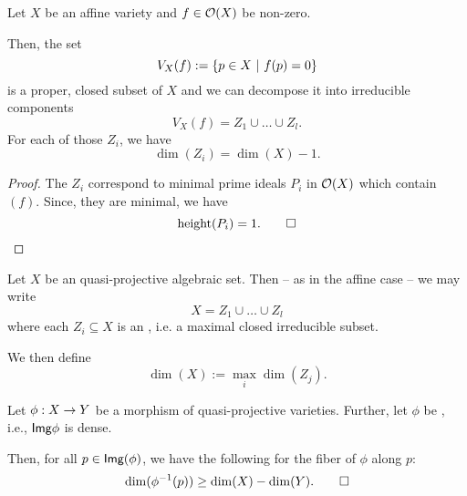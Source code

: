 \begin{lemma}
	Let $X$ be an affine variety and $f\in \mathcal{O}(X)$ be non-zero.
	
	Then, the set
	\[ V_X(f) := \left\lbrace p \in X ~ | ~ f(p) = 0\right\rbrace \]
	is a proper, closed subset of $X$ and we can decompose it into irreducible components
	\[ V_X(f) = Z_1\cup \ldots \cup Z_l. \]
	For each of those $Z_i$, we have
	\[ \dim(Z_i) = \dim(X) - 1. \]
\end{lemma}
\begin{proof}
	The $Z_i$ correspond to minimal prime ideals $P_i$ in $\mathcal{O}(X)$ which contain $(f)$. Since, they are minimal, we have
	\[ \mathrm{height}(P_i) = 1.\qedhere \]
\end{proof}

\begin{lemma}
	Let $X$ be an quasi-projective algebraic set. Then -- as in the affine case -- we may write
	\[ X = Z_1\cup\ldots \cup Z_l \]
	where each $Z_i \subseteq X$ is an , i.e. a maximal closed irreducible subset.
	
	We then define
	\[ \dim(X) := \max_i \dim(Z_j). \]
\end{lemma}
\begin{lemma}
	Let $\phi :X \overset{}{\rightarrow} Y$ be a morphism of quasi-projective varieties. Further, let $\phi$ be , i.e., $\textsf{Img} \phi$ is dense.
	
	Then, for all $p \in \textsf{Img}(\phi)$, we have the following for the fiber of $\phi$ along $p$:
	\[ \dim(\phi^{-1}(p)) \geq \dim(X) - \dim(Y).\qedhere \]
\end{lemma}